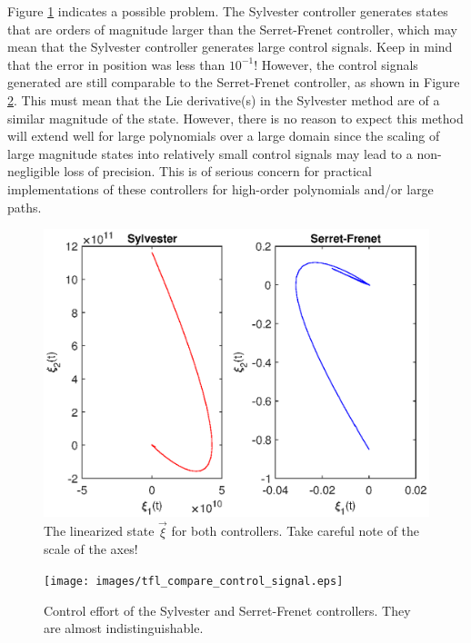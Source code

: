 Figure \ref{fig:tfl_compare_state} indicates a possible problem. The Sylvester controller generates states that are orders of magnitude larger than the Serret-Frenet controller, which may mean that the Sylvester controller generates large control signals. Keep in mind that the error in position was less than $10^{-1}$! However, the control signals generated are still comparable to the Serret-Frenet controller, as shown in Figure \ref{fig:control_effort}. This must mean that the Lie derivative(s) in the Sylvester method are of a similar magnitude of the state. However, there is no reason to expect this method will extend well for large polynomials over a large domain since the scaling of large magnitude states into relatively small control signals may lead to a non-negligible loss of precision. This is of serious concern for practical implementations of these controllers for high-order polynomials and/or large paths.
\begin{figure}[!htbp]
    \centering
    \includegraphics{images/tfl_compare_state.eps}
    \caption{The linearized state $\vec{\xi}$ for both controllers. Take careful note of the scale of the axes!}
    \label{fig:tfl_compare_state}
\end{figure}
\begin{figure}[!htbp]
    \centering
    \texttt{[image: images/tfl\_compare\_control\_signal.eps]}
    \caption{Control effort of the Sylvester and Serret-Frenet controllers. They are almost indistinguishable.}
    \label{fig:control_effort}
\end{figure}


